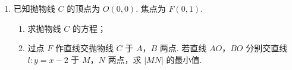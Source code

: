 \begin{description}
\begin{enumerate}[leftmargin=5pt]
        \item 已知抛物线 \(C\) 的顶点为 \(O(0,0)\). 焦点为 \(F(0,1)\).
\begin{enumerate}
\item 求抛物线 \(C\) 的方程；
\item 过点 \(F\) 作直线交抛物线 \(C\) 于 \(A\)，\(B\) 两点. 若直线 \(AO\)，\(BO\) 分别交直线 \(l: y = x - 2\) 于 \(M\)，\(N\) 两点，求 \(|MN|\) 的最小值.
\end{enumerate}

    \end{enumerate}

\end{description}
